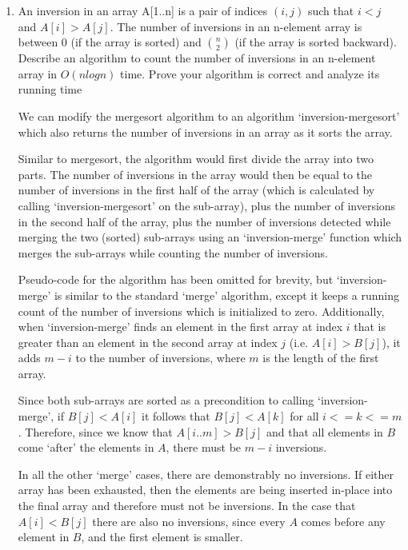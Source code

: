 \documentclass{article}
\newcommand{\question}[1]{\bgroup\color{blue}#1\egroup}
\begin{document}
\begin{enumerate}
\begin{enumerate}
    \end{enumerate}

\item 
  \question{An inversion in an array A[1..n] is a pair of indices $(i, j)$ such that $i < j$ and
$A[i] > A[j]$. The number of inversions in an n-element array is between 0 (if the array is sorted)
and $n \choose 2$ (if the array is sorted backward). Describe an algorithm to count the number of inversions
in an n-element array in $O(n log n)$ time. Prove your algorithm is correct and analyze its running
time
}


We can modify the mergesort algorithm to an algorithm `inversion-mergesort' which also returns the number of inversions in an array as it sorts the array.

Similar to mergesort, the algorithm would first divide the array into two parts. 
The number of inversions in the array would then be equal to the number of inversions in the first half of the array (which is calculated by calling `inversion-mergesort' on the sub-array), plus the number of inversions in the second half of the array, plus the number of inversions detected while merging the two (sorted) sub-arrays using an `inversion-merge' function which merges the sub-arrays while counting the number of inversions.

Pseudo-code for the algorithm has been omitted for brevity, but `inversion-merge' is similar to the standard `merge' algorithm, except it keeps a running count of the number of inversions which is initialized to zero. 
Additionally, when `inversion-merge' finds an element in the first array at index $i$ that is greater than an element in the second array at index $j$ (i.e. $A[i] > B[j]$), it adds $m-i$ to the number of inversions, where $m$ is the length of the first array.

Since both sub-arrays are sorted as a precondition to calling `inversion-merge', if $B[j] < A[i]$ it follows that $B[j] < A[k]$ for all $i <= k <=m$. Therefore, since we know that $A[i..m] > B[j]$ and that all elements in $B$ come `after' the elements in $A$, there must be $m-i$ inversions.

In all the other `merge' cases, there are demonstrably no inversions. If either array has been exhausted, then the elements are being inserted in-place into the final array and therefore must not be inversions. In the case that $A[i] < B[j]$ there are also no inversions, since every $A$ comes before any element in $B$, and the first element is smaller.


\end{enumerate}
\end{document}
